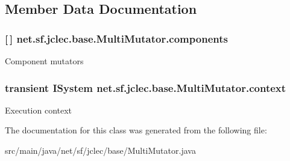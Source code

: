 \subsection{Member Data Documentation}
\hypertarget{classnet_1_1sf_1_1jclec_1_1base_1_1_multi_mutator_aabf753291ca8162a09379ba0cf88b19a}{
\subsubsection[{components}]{ \mbox{[}$\,$\mbox{]} net.\-sf.\-jclec.\-base.\-Multi\-Mutator.\-components\hspace{0.3cm}{\ttfamily [protected]}}}\label{classnet_1_1sf_1_1jclec_1_1base_1_1_multi_mutator_aabf753291ca8162a09379ba0cf88b19a}
Component mutators \hypertarget{classnet_1_1sf_1_1jclec_1_1base_1_1_multi_mutator_a57d0ceede263269327910e02566c6197}{
\subsubsection[{context}]{\setlength{\rightskip}{0pt plus 5cm}transient {\bf I\-System} net.\-sf.\-jclec.\-base.\-Multi\-Mutator.\-context\hspace{0.3cm}{\ttfamily [protected]}}}\label{classnet_1_1sf_1_1jclec_1_1base_1_1_multi_mutator_a57d0ceede263269327910e02566c6197}
Execution context 

The documentation for this class was generated from the following file\-:\begin{DoxyCompactItemize}
\item 
src/main/java/net/sf/jclec/base/Multi\-Mutator.\-java\end{DoxyCompactItemize}
